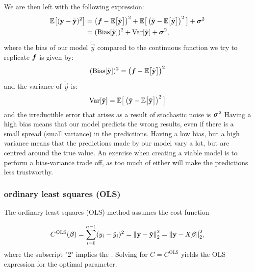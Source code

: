 We are then left with the following expression:
\begin{align*}
    \mathbb{E}\big[(\mathbf{y}-\tilde{\mathbf{y}})^2\big] &= \left(\boldsymbol{f}-\mathbb{E}\big[\tilde{\mathbf{y}}\big]\right)^2+ \mathbb{E}\big[\left(\tilde{\mathbf{y}}-\mathbb{E}\big[\tilde{\mathbf{y}}\big]\right)^2\big] + \boldsymbol{\sigma}^2 \\
    &= (\mathrm{Bias}[\tilde{\mathbf{y}}])^2 + \mathrm{Var}[{\tilde{\mathbf{y}}}]+ \boldsymbol{\sigma}^2,
\end{align*}
where the bias of our model $\tilde{\vec{y}}$ compared to the continuous function we try to replicate $\boldsymbol{f}$ is given by:
\begin{align*}
    (\mathrm{Bias}[\tilde{\mathbf{y}}])^2 = \left(\boldsymbol{f}-\mathbb{E}\big[\tilde{\mathbf{y}}\big]\right)^2
\end{align*}
and the variance of $\tilde{\vec{y}}$ is:
\begin{align*}
    \mathrm{Var}[{\tilde{\mathbf{y}}}] = \mathbb{E}\big[\left(\tilde{\mathbf{y}}-\mathbb{E}\big[\tilde{\mathbf{y}}\big]\right)^2\big]
\end{align*}
and the irreductible error that arises as a result of stochastic noise is $\boldsymbol{\sigma}^2$
Having a high bias means that our model predicts the wrong results, even if there is a small spread (small variance) in the predictions. Having a low bias, but a high variance means that the predictions made by our model vary a lot, but are centred around the true value. An exercise when creating a viable model is to perform a bias-variance trade off, as too much of either will make the predictions less trustworthy. 







\subsubsection{ordinary least squares (OLS)}\label{sec:OLS}

The ordinary least squares (OLS) method assumes the cost function

\begin{align*}
    C^\text{OLS}(\boldsymbol{\beta}) = \sum_{i=0}^{n-1}(y_i - \tilde{y}_i)^2 =  \norm{\mathbf{y}-\tilde{\mathbf{y}}}_2^{2} = \norm{\mathbf{y}-X\boldsymbol{\beta}}_2^{2},
\end{align*}
where the subscript "2" implies the \footnotemark. Solving  for $C=C^\text{OLS}$ yields the OLS expression for the optimal parameter.

